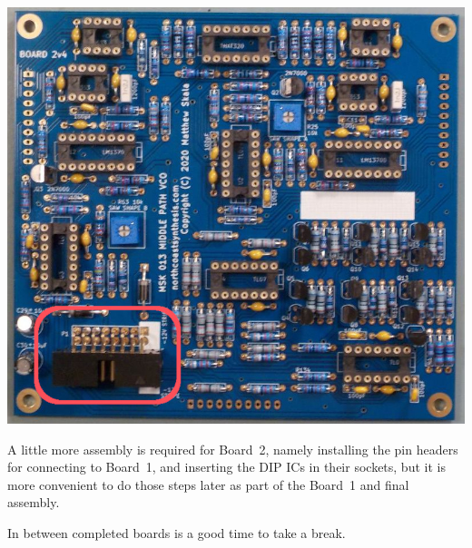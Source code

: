 \nopagebreak
\noindent\includegraphics[width=\linewidth]{power.jpg}

A little more assembly is required for Board~2, namely installing the pin
headers for connecting to Board~1, and inserting the DIP ICs in their
sockets, but it is more convenient to do those steps later as part of the
Board~1 and final assembly.

In between completed boards is a good time to take a break.
